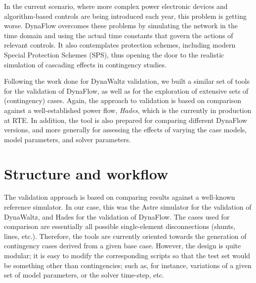 \documentclass[conference]{IEEEtran}
\begin{document}
In the current scenario, where more complex power electronic devices and
algorithm-based controls are being introduced each year, this problem is getting
worse. DynaFlow overcomes these problems by simulating the network in the time
domain and using the actual time constants that govern the actions of relevant
controls. It also contemplates protection schemes, including modern Special
Protection Schemes (SPS), thus opening the door to the realistic simulation of
cascading effects in contingency studies.

Following the work done for DynaWaltz validation, we built a similar set of
tools for the validation of DynaFlow, as well as for the exploration of
extensive sets of (contingency) cases.  Again, the approach to validation is
based on comparison against a well-established power flow, \emph{Hades}, which
is the currently in production at RTE. In addition, the tool is also prepared
for comparing different DynaFlow versions, and more generally for assessing the
effects of varying the case models, model parameters, and solver parameters.




\section{Structure and workflow}

The validation approach is based on comparing results against a well-known
reference simulator. In our case, this was the Astre simulator for the
validation of DynaWaltz, and Hades for the validation of DynaFlow. The cases
used for comparison are essentially all possible single-element disconnections
(shunts, lines, etc.). Therefore, the tools are currently oriented towards the
generation of contingency cases derived from a given base case. However, the
design is quite modular; it is easy to modify the corresponding scripts so that
the test set would be something other than contingencies; such as, for instance,
variations of a given set of model parameters, or the solver time-step, etc.
\end{document}
